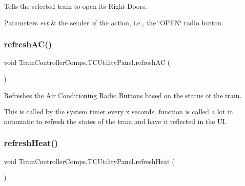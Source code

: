 Tells the selected train to open its Right Doors. 


\begin{DoxyParams}{Parameters}
{\em evt} & the sender of the action, i.\+e., the \char`\"{}\+O\+P\+E\+N\char`\"{} radio button. \\
\hline
\end{DoxyParams}
\mbox{\label{classTrainControllerComps_1_1TCUtilityPanel_a0f0e32861d6be9a11dba70ce291c068d}} 
\subsubsection{\texorpdfstring{refresh\+A\+C()}{refreshAC()}}
{\footnotesize\ttfamily void Train\+Controller\+Comps.\+T\+C\+Utility\+Panel.\+refresh\+AC (\begin{DoxyParamCaption}{ }\end{DoxyParamCaption})\hspace{0.3cm}{\ttfamily [private]}}



Refreshes the Air Conditioning Radio Buttons based on the status of the train. 

This is called by the system timer every \textquotesingle{}x\textquotesingle{} seconds. function is called a lot in automatic to refresh the states of the train and have it reflected in the UI. \mbox{\label{classTrainControllerComps_1_1TCUtilityPanel_a58e2492e881e7a093f62b54c2023df28}} 
\subsubsection{\texorpdfstring{refresh\+Heat()}{refreshHeat()}}
{\footnotesize\ttfamily void Train\+Controller\+Comps.\+T\+C\+Utility\+Panel.\+refresh\+Heat (\begin{DoxyParamCaption}{ }\end{DoxyParamCaption})\hspace{0.3cm}{\ttfamily [private]}}



